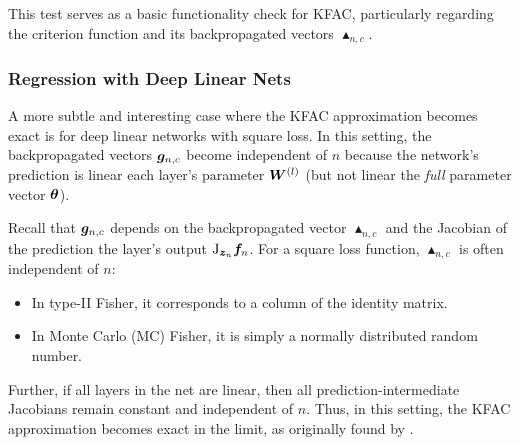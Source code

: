This test serves as a basic functionality check for KFAC, particularly regarding the criterion function and its backpropagated vectors $\blacktriangle_{n,c}$.

\switchcolumn[1]
\switchcolumn[0]

\subsubsection{Regression with Deep Linear Nets}

A more subtle and interesting case where the KFAC approximation becomes exact is for deep linear networks with square loss.
In this setting, the backpropagated vectors ${\bm{g}}_{n,c}$ become independent of $n$ because the network's prediction is linear \wrt each layer's parameter ${\bm{W}}^{(l)}$ (but not linear \wrt the \emph{full} parameter vector ${\bm{\theta}}$).

Recall that ${\bm{g}}_{n,c}$ depends on the backpropagated vector $\blacktriangle_{n,c}$ and the Jacobian of the prediction \wrt the layer's output $\mathrm{J}_{{\bm{z}}_n} {\bm{f}}_n$.
For a square loss function, $\blacktriangle_{n,c}$ is often independent of $n$:
\begin{itemize}
\item In type-II Fisher, it corresponds to a column of the identity matrix.
\item In Monte Carlo (MC) Fisher, it is simply a normally distributed random number.
\end{itemize}
Further, if all layers in the net are linear, then all prediction-intermediate Jacobians remain constant and independent of $n$.
Thus, in this setting, the KFAC approximation becomes exact in the limit, as originally found by \citet{bernacchia2018exact}.

